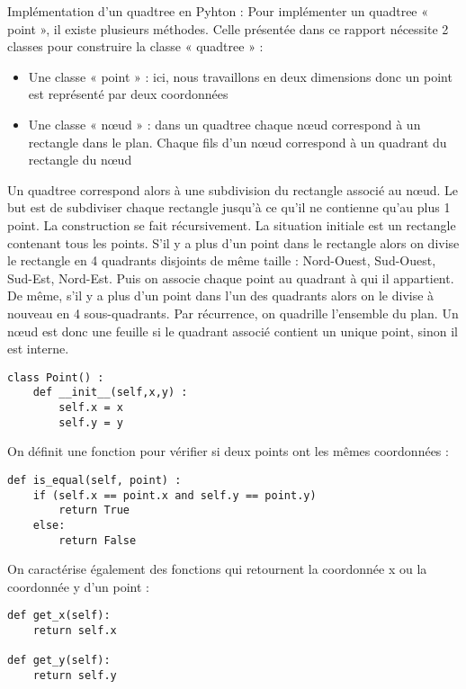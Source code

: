 \documentclass{report}
\begin{document}
Implémentation d’un quadtree en Pyhton :
Pour implémenter un quadtree « point », il existe plusieurs méthodes. Celle présentée dans ce rapport nécessite 2 classes pour construire la classe « quadtree » :
\begin{itemize}
\item Une classe « point » : ici, nous travaillons en deux dimensions donc un point est représenté par deux coordonnées
\item Une classe « nœud » : dans un quadtree chaque nœud correspond à un rectangle dans le plan. Chaque fils d’un nœud correspond à un quadrant du rectangle du nœud 
\end{itemize}
Un quadtree correspond alors à une subdivision du rectangle associé au nœud. Le but est de subdiviser chaque rectangle jusqu’à ce qu’il ne contienne qu’au plus 1 point.
La construction se fait récursivement. La situation initiale est un rectangle contenant tous les points. S’il y a plus d’un point dans le rectangle alors on divise le rectangle en 4 quadrants disjoints de même taille : Nord-Ouest, Sud-Ouest, Sud-Est, Nord-Est. Puis on associe chaque point au quadrant à qui il appartient. De même, s’il y a plus d’un point dans l’un des quadrants alors on le divise à nouveau en 4 sous-quadrants. Par récurrence, on quadrille l’ensemble du plan.
Un nœud est donc une feuille si le quadrant associé contient un unique point, sinon il est interne.
\begin{lstlisting}
class Point() :
	def __init__(self,x,y) :
		self.x = x
		self.y = y
\end{lstlisting}

On définit une fonction pour vérifier si deux points ont les mêmes coordonnées : 
\begin{lstlisting}
def is_equal(self, point) :
	if (self.x == point.x and self.y == point.y)
	 	return True
	else:
		return False
\end{lstlisting}

On caractérise également des fonctions qui retournent la coordonnée x ou la coordonnée y d’un point :
\begin{lstlisting}
def get_x(self):
	return self.x
	
def get_y(self):
	return self.y
\end{lstlisting}
 
\end{document}
